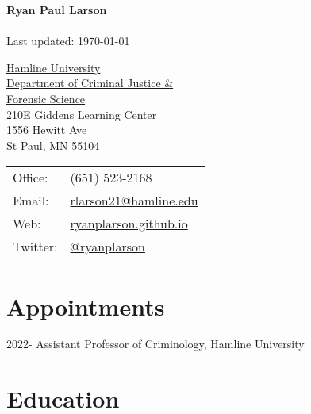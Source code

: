 \documentclass[letterpaper]{article}
\def\name{Ryan Paul Larson}
\renewenvironment{itemize}{
  \begin{list}{}{
    \setlength{\leftmargin}{1.5em}
  }
}{
  \end{list}
}
\begin{document}
\textbf{{\huge \name}}\\
\\
Last updated: \today

\vspace{5ex}





\begin{minipage}{0.45\linewidth}
  \href{https://www.hamline.edu/}{Hamline University} \\
   \href{https://www.hamline.edu/academics/undergraduate/criminology}{Department of Criminal Justice \& \\  Forensic Science} \\
  210E Giddens Learning Center \\
 1556 Hewitt Ave \\
 St Paul, MN 55104
\end{minipage}
\begin{minipage}{0.45\linewidth}
  \begin{tabular}{ll}
    Office: & (651) 523-2168 \\
    Email: & \href{mailto:rlarson21@hamline.edu}{rlarson21@hamline.edu} \\
    Web: & \href{https://ryanplarson.github.io/personal_site/}{ryanplarson.github.io} \\
   Twitter: &  \href{https://twitter.com/ryanplarson}{@ryanplarson} \\
  \end{tabular}
\end{minipage}



\section*{\textbf{Appointments}}


\begin{itemize}

\item 2022-    Assistant Professor of Criminology, Hamline University

\end{itemize}



\section*{\textbf{Education}}
\end{document}
